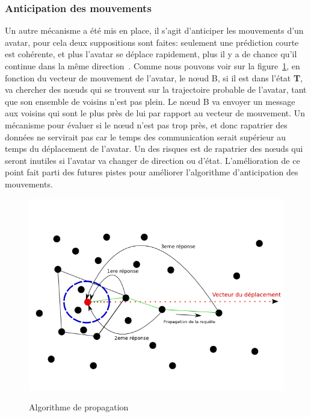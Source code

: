 	\subsubsection{Anticipation des mouvements}
	Un autre mécanisme a été mis en place, il s'agit d'anticiper les mouvements d'un avatar, pour cela deux suppositions sont faites: seulement une prédiction courte est cohérente, et plus l'avatar se déplace rapidement, plus il y a de chance qu'il continue dans la même direction~\cite{191}. Comme nous pouvons voir sur la figure~\ref{Propa_Algo}, en fonction du vecteur de mouvement de l'avatar, le nœud B, si il est dans l'état \textbf{T}, va chercher des nœuds qui se trouvent sur la trajectoire probable de l'avatar, tant que son ensemble de voisins n'est pas plein. Le nœud B va envoyer un message aux voisins qui sont le plus près de lui par rapport au vecteur de mouvement. Un mécanisme pour évaluer si le nœud n'est pas trop près, et donc rapatrier des données ne servirait pas car le temps des communication serait supérieur au temps du déplacement de l'avatar. Un des risques est de rapatrier des nœuds qui seront inutiles si l'avatar va changer de direction ou d'état. L'amélioration de ce point fait parti des futures pistes pour améliorer l'algorithme d'anticipation des mouvements.\\
	\vspace{5mm}
        \begin{figure}[!h]
        \centering
        \includegraphics[scale=0.5]{../Images/propagation_algo.png}\\
        \caption{Algorithme de propagation}
        \label{Propa_Algo}
        \end{figure}
        \vspace{5mm}
